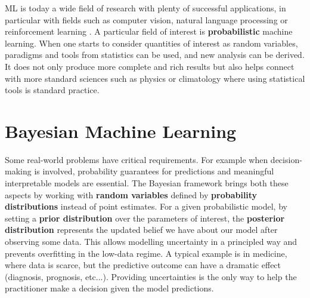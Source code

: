 

\ifpdf
    \graphicspath{{chapters/1_introduction/figures/}}
\else
    \graphicspath{{1_introduction/figures/EPS/}{1_introduction/figures/}}
\fi

\ac{ML} is today a wide field of research with plenty of successful applications, in particular with fields such as computer vision, natural language processing or reinforcement learning \needcite.
A particular field of interest is \textbf{probabilistic} machine learning.
When one starts to consider quantities of interest as random variables, paradigms and tools from statistics can be used, and new analysis can be derived.
It does not only produce more complete and rich results but also helps connect with more standard sciences such as physics or climatology where using statistical tools is standard practice.

\section{Bayesian Machine Learning}

Some real-world problems have critical requirements.
For example when decision-making is involved, probability guarantees for predictions and meaningful interpretable models are essential.
The Bayesian framework brings both these aspects by working with \textbf{random variables} defined by \textbf{probability distributions} instead of point estimates.
For a given probabilistic model, by setting a \textbf{prior distribution} over the parameters of interest, the \textbf{posterior distribution} represents the updated belief we have about our model after observing some data.
This allows modelling uncertainty in a principled way and prevents overfitting in the low-data regime.\needcite
A typical example is in medicine, where data is scarce, but the predictive outcome can have a dramatic effect (diagnosis, prognosis, etc...).
Providing uncertainties is the only way to help the practitioner make a decision given the model predictions.

